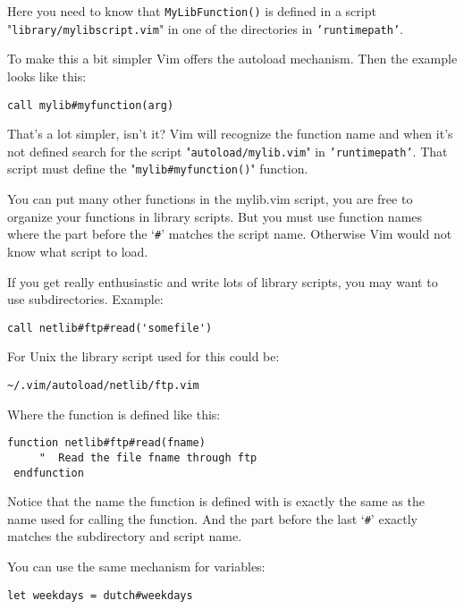 Here you need to know that \texttt{MyLibFunction()} is defined in a script "\texttt{library/mylibscript.vim}" in one of the directories in \texttt{'runtimepath'}.

To make this a bit simpler Vim offers the autoload mechanism.
Then the example looks like this:

\begin{Verbatim}[samepage=true]
 call mylib#myfunction(arg)
\end{Verbatim}

That's a lot simpler, isn't it?
Vim will recognize the function name and when it's not defined search for the script "\texttt{autoload/mylib.vim}" in \texttt{'runtimepath'}.
That script must define the "\texttt{mylib\#myfunction()}" function.

You can put many other functions in the mylib.vim script, you are free to organize your functions in library scripts.
But you must use function names where the part before the `\texttt{\#}' matches the script name.
Otherwise Vim would not know what script to load.

If you get really enthusiastic and write lots of library scripts, you may want to use subdirectories.
Example:

\begin{Verbatim}[samepage=true]
 call netlib#ftp#read('somefile')
\end{Verbatim}

For Unix the library script used for this could be:

\begin{Verbatim}[samepage=true]
    ~/.vim/autoload/netlib/ftp.vim
\end{Verbatim}

Where the function is defined like this:

\begin{Verbatim}[samepage=true]
 function netlib#ftp#read(fname)
     "  Read the file fname through ftp
 endfunction
\end{Verbatim}

Notice that the name the function is defined with is exactly the same as the name used for calling the function.
And the part before the last `\texttt{\#}' exactly matches the subdirectory and script name.

You can use the same mechanism for variables:

\begin{Verbatim}[samepage=true]
 let weekdays = dutch#weekdays
\end{Verbatim}

